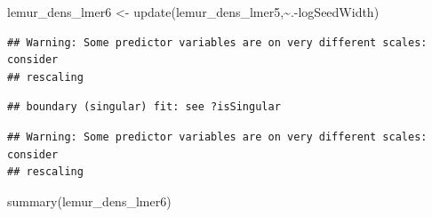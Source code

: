 \documentclass[
  12pt,
]{article}
\newenvironment{Shaded}{\begin{snugshade}}{\end{snugshade}}
\newcommand{\FunctionTok}[1]{\textcolor[rgb]{0.00,0.00,0.00}{#1}}
\newcommand{\NormalTok}[1]{#1}
\newcommand{\OtherTok}[1]{\textcolor[rgb]{0.56,0.35,0.01}{#1}}
\newcommand{\SpecialCharTok}[1]{\textcolor[rgb]{0.00,0.00,0.00}{#1}}
\begin{document}
\begin{Shaded}
\begin{Highlighting}[]
\NormalTok{lemur\_dens\_lmer6 }\OtherTok{\textless{}{-}} \FunctionTok{update}\NormalTok{(lemur\_dens\_lmer5,}\SpecialCharTok{\textasciitilde{}}\NormalTok{.}\SpecialCharTok{{-}}\NormalTok{logSeedWidth)}
\end{Highlighting}
\end{Shaded}

\begin{verbatim}
## Warning: Some predictor variables are on very different scales: consider
## rescaling
\end{verbatim}

\begin{verbatim}
## boundary (singular) fit: see ?isSingular
\end{verbatim}

\begin{verbatim}
## Warning: Some predictor variables are on very different scales: consider
## rescaling
\end{verbatim}

\begin{Shaded}
\begin{Highlighting}[]
\FunctionTok{summary}\NormalTok{(lemur\_dens\_lmer6)}
\end{Highlighting}
\end{Shaded}
\end{document}
